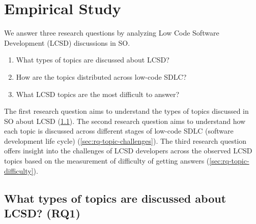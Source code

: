 \section{Empirical Study} \label{sec:results}
We answer three research questions by analyzing Low Code Software Development (LCSD)  discussions in SO.
\begin{enumerate}[leftmargin=30pt, label=\bf{RQ\arabic{*}.}]
  \item What types of topics are discussed about LCSD? 
  \item How are the topics distributed across low-code SDLC? 
  \item What LCSD topics are the most difficult to answer?
\end{enumerate}
The first research question aims to understand the types of topics discussed in
SO about LCSD (\sec\ref{sec:rq-topic-type}). The second research
question aims to understand how each topic is discussed across different stages of low-code SDLC (software development life cycle) (\sec\ref{sec:rq-topic-challenges}). The third research question offers insight into the challenges of LCSD 
developers across the observed LCSD topics based on the measurement of difficulty of getting answers (\sec\ref{sec:rq-topic-difficulty}).


\subsection{What types of topics are discussed about LCSD? (RQ1)}\label{sec:rq-topic-type}

 


